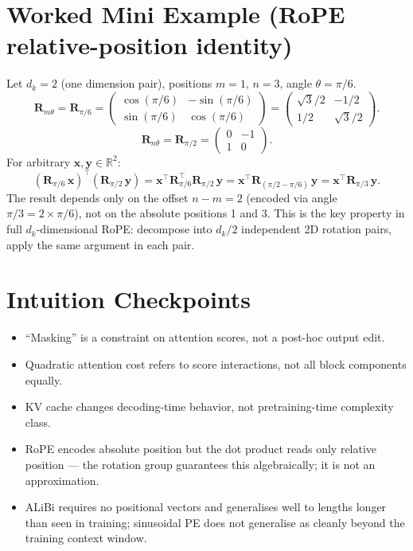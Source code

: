 \section*{Worked Mini Example (RoPE relative-position identity)}
Let $d_k = 2$ (one dimension pair), positions $m = 1$, $n = 3$, angle $\theta = \pi/6$.
\[
  \mathbf{R}_{m\theta} = \mathbf{R}_{\pi/6} =
  \begin{pmatrix} \cos(\pi/6) & -\sin(\pi/6) \\ \sin(\pi/6) & \cos(\pi/6) \end{pmatrix}
  = \begin{pmatrix} \sqrt{3}/2 & -1/2 \\ 1/2 & \sqrt{3}/2 \end{pmatrix}.
\]
\[
  \mathbf{R}_{n\theta} = \mathbf{R}_{\pi/2} =
  \begin{pmatrix} 0 & -1 \\ 1 & 0 \end{pmatrix}.
\]
For arbitrary $\mathbf{x}, \mathbf{y} \in \mathbb{R}^2$:
\[
  (\mathbf{R}_{\pi/6}\,\mathbf{x})^\top (\mathbf{R}_{\pi/2}\,\mathbf{y})
  = \mathbf{x}^\top \mathbf{R}_{\pi/6}^\top \mathbf{R}_{\pi/2}\,\mathbf{y}
  = \mathbf{x}^\top \mathbf{R}_{(\pi/2 - \pi/6)}\,\mathbf{y}
  = \mathbf{x}^\top \mathbf{R}_{\pi/3}\,\mathbf{y}.
\]
The result depends only on the offset $n - m = 2$ (encoded via angle $\pi/3 = 2 \times \pi/6$), not on the absolute positions 1 and 3. This is the key property in full $d_k$-dimensional RoPE: decompose into $d_k/2$ independent 2D rotation pairs, apply the same argument in each pair.

\section*{Intuition Checkpoints}
\begin{itemize}[leftmargin=1.5em]
  \item ``Masking'' is a constraint on attention scores, not a post-hoc output edit.
  \item Quadratic attention cost refers to score interactions, not all block components equally.
  \item KV cache changes decoding-time behavior, not pretraining-time complexity class.
  \item RoPE encodes absolute position but the dot product reads only relative position --- the rotation group guarantees this algebraically; it is not an approximation.
  \item ALiBi requires no positional vectors and generalises well to lengths longer than seen in training; sinusoidal PE does not generalise as cleanly beyond the training context window.
\end{itemize}

